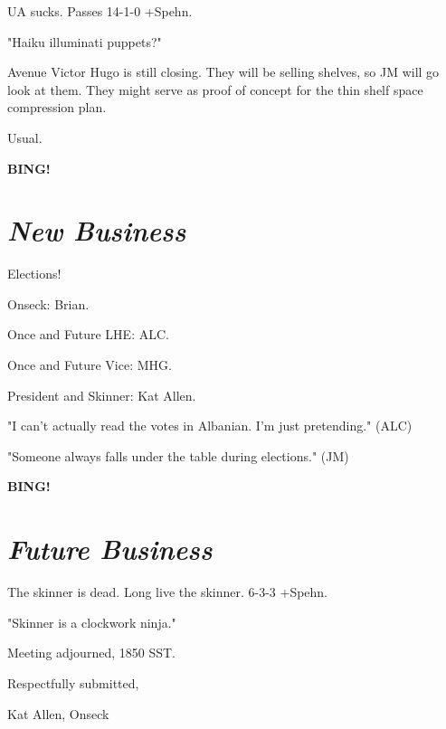 \documentclass[10pt]{article}
\newcommand{\bing}{{\bf BING!} }
\newcommand{\goto}[1]{\bing \vskip 12pt \section*{{\em{#1}}}}
\begin{document}
UA sucks. Passes 14-1-0 +Spehn.

"Haiku illuminati puppets?"

Avenue Victor Hugo is still closing. They will be selling shelves, so JM will go look at them. They might serve as proof of concept for the thin shelf space compression plan.

Usual.

\goto{New Business}

Elections!

Onseck: Brian.

Once and Future LHE: ALC.

Once and Future Vice: MHG.

President and Skinner: Kat Allen.

"I can't actually read the votes in Albanian. I'm just pretending." (ALC)

"Someone always falls under the table during elections." (JM)

\goto{Future Business}

The skinner is dead. Long live the skinner. 6-3-3 +Spehn.

"Skinner is a clockwork ninja."

\noindent
Meeting adjourned, 1850 SST.

\vspace{18pt}

\centerline{Respectfully submitted,}
\centerline{Kat Allen,  Onseck}
\end{document}
